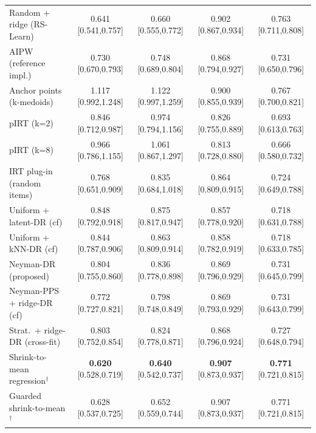 \begin{tabular}{l cccc}
Random + ridge (RS-Learn) & 0.641 {\scriptsize[0.541,0.757]} & 0.660 {\scriptsize[0.555,0.772]} & 0.902 {\scriptsize[0.867,0.934]} & 0.763 {\scriptsize[0.711,0.808]} \\
AIPW (reference impl.) & 0.730 {\scriptsize[0.670,0.793]} & 0.748 {\scriptsize[0.689,0.804]} & 0.868 {\scriptsize[0.794,0.927]} & 0.731 {\scriptsize[0.650,0.796]} \\
Anchor points (k-medoids) & 1.117 {\scriptsize[0.992,1.248]} & 1.122 {\scriptsize[0.997,1.259]} & 0.900 {\scriptsize[0.855,0.939]} & 0.767 {\scriptsize[0.700,0.821]} \\
pIRT (k=2) & 0.846 {\scriptsize[0.712,0.987]} & 0.974 {\scriptsize[0.794,1.156]} & 0.826 {\scriptsize[0.755,0.889]} & 0.693 {\scriptsize[0.613,0.763]} \\
pIRT (k=8) & 0.966 {\scriptsize[0.786,1.155]} & 1.061 {\scriptsize[0.867,1.297]} & 0.813 {\scriptsize[0.728,0.880]} & 0.666 {\scriptsize[0.580,0.732]} \\
IRT plug-in (random items) & 0.768 {\scriptsize[0.651,0.909]} & 0.835 {\scriptsize[0.684,1.018]} & 0.864 {\scriptsize[0.809,0.915]} & 0.724 {\scriptsize[0.649,0.788]} \\
Uniform + latent-DR (cf) & 0.848 {\scriptsize[0.792,0.918]} & 0.875 {\scriptsize[0.817,0.947]} & 0.857 {\scriptsize[0.778,0.920]} & 0.718 {\scriptsize[0.631,0.788]} \\
Uniform + kNN-DR (cf) & 0.844 {\scriptsize[0.787,0.906]} & 0.863 {\scriptsize[0.809,0.914]} & 0.858 {\scriptsize[0.782,0.919]} & 0.718 {\scriptsize[0.633,0.785]} \\
Neyman-DR (proposed) & 0.804 {\scriptsize[0.755,0.860]} & 0.836 {\scriptsize[0.778,0.898]} & 0.869 {\scriptsize[0.796,0.929]} & 0.731 {\scriptsize[0.645,0.799]} \\
Neyman-PPS + ridge-DR (cf) & 0.772 {\scriptsize[0.727,0.821]} & 0.798 {\scriptsize[0.748,0.849]} & 0.869 {\scriptsize[0.793,0.929]} & 0.731 {\scriptsize[0.643,0.799]} \\
Strat.\ + ridge-DR (cross-fit) & 0.803 {\scriptsize[0.752,0.854]} & 0.824 {\scriptsize[0.778,0.871]} & 0.868 {\scriptsize[0.796,0.924]} & 0.727 {\scriptsize[0.648,0.794]} \\
Shrink-to-mean regression$^\dagger$ & \textbf{0.620} {\scriptsize[0.528,0.719]} & \textbf{0.640} {\scriptsize[0.542,0.737]} & \textbf{0.907} {\scriptsize[0.873,0.937]} & \textbf{0.771} {\scriptsize[0.721,0.815]} \\
Guarded shrink-to-mean$^\dagger$ & 0.628 {\scriptsize[0.537,0.725]} & 0.652 {\scriptsize[0.559,0.744]} & 0.907 {\scriptsize[0.873,0.937]} & 0.771 {\scriptsize[0.721,0.815]} \\

\end{tabular}
